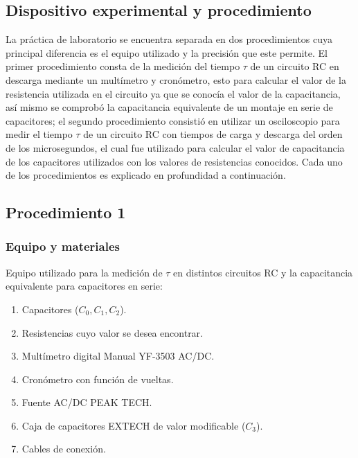 \documentclass[10pt,letter]{article}
\begin{document}
\begin{multicols}{2}

\section{Dispositivo experimental y procedimiento}
La práctica de laboratorio se encuentra separada en dos procedimientos cuya principal diferencia es el equipo utilizado y la precisión que este permite. El primer procedimiento consta de la medición del tiempo $\tau$ de un circuito RC en descarga mediante un multímetro y cronómetro, esto para calcular el valor de la resistencia utilizada en el circuito ya que se conocía el valor de la capacitancia, así mismo se comprobó la capacitancia equivalente de un montaje en serie de capacitores; el segundo procedimiento consistió en utilizar un osciloscopio para medir el tiempo $\tau$ de un circuito RC con tiempos de carga y descarga del orden de los microsegundos, el cual fue utilizado para calcular el valor de capacitancia de los capacitores utilizados con los valores de resistencias conocidos. Cada uno de los procedimientos es explicado en profundidad a continuación.

\subsection{Procedimiento 1}
\subsubsection{Equipo y materiales}
Equipo utilizado para la medición de $\tau$ en distintos circuitos RC y la capacitancia equivalente  para capacitores en serie:
\begin{enumerate}
\itemsep=0em
\item Capacitores ($C_0,C_1,C_2$).
\item Resistencias cuyo valor se desea encontrar.
\item Multímetro digital Manual YF-3503 AC/DC.
\item Cronómetro con función de vueltas. 
\item Fuente AC/DC PEAK TECH.
\item Caja de capacitores EXTECH de valor modificable ($C_3$).
\item Cables de conexión.
\end{enumerate}


\end{multicols}
\end{document}
